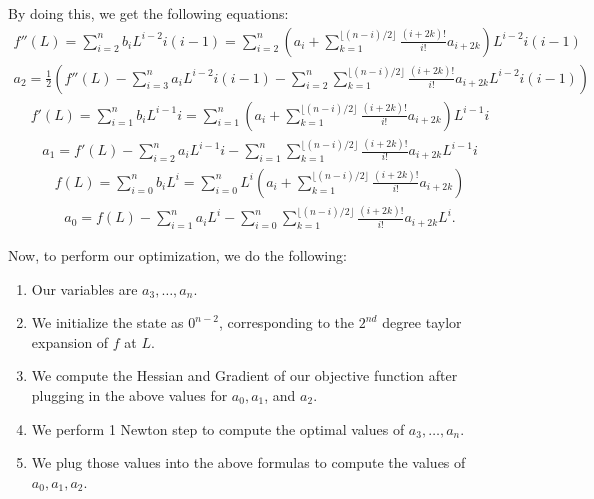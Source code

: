 \documentclass[11pt]{article}
\begin{document}
By doing this, we get the following equations:
\begin{align}
    f''(L) = \sum_{i=2}^n b_i L^{i-2} i(i-1) = \sum_{i=2}^n \left(a_i + \sum_{k=1}^{\lfloor (n-i)/2\rfloor} \frac{(i+2k)!}{i!} a_{i+2k}\right) L^{i-2} i(i-1)
\end{align}
\begin{align}
    a_2 = \frac{1}{2}\left(f''(L) - \sum_{i=3}^n a_i L^{i-2}i(i-1) - \sum_{i=2}^n \sum_{k=1}^{\lfloor (n-i)/2\rfloor} \frac{(i+2k)!}{i!} a_{i+2k}L^{i-2}i(i-1)\right)
\end{align}
\begin{align}
    f'(L) = \sum_{i=1}^n b_i L^{i-1} i = \sum_{i=1}^n \left(a_i + \sum_{k=1}^{\lfloor (n-i)/2\rfloor} \frac{(i+2k)!}{i!} a_{i+2k}\right) L^{i-1}i
\end{align}
\begin{align}
    a_1 = f'(L) - \sum_{i=2}^n a_i L^{i-1}i - \sum_{i=1}^n\sum_{k=1}^{\lfloor (n-i)/2\rfloor} \frac{(i+2k)!}{i!} a_{i+2k}L^{i-1}i
\end{align}
\begin{align}
    f(L) = \sum_{i=0}^n b_i L^i = \sum_{i=0}^n L^i \left( a_i + \sum_{k=1}^{\lfloor (n-i)/2\rfloor} \frac{(i+2k)!}{i!} a_{i+2k}\right)
\end{align}
\begin{align}
    a_0 = f(L) - \sum_{i=1}^n a_i L^i - \sum_{i=0}^n \sum_{k=1}^{\lfloor (n-i)/2\rfloor} \frac{(i+2k)!}{i!} a_{i+2k}L^i.
\end{align}

Now, to perform our optimization, we do the following:

\begin{enumerate}
    \item Our variables are $a_3, \dots, a_n$.
    \item We initialize the state as $0^{n-2}$, corresponding to the $2^{nd}$ degree taylor expansion of $f$ at $L$.
    \item We compute the Hessian and Gradient of our objective function after plugging in the above values for $a_0, a_1$, and $a_2$.
    \item We perform 1 Newton step to compute the optimal values of $a_3, \dots, a_n$.
    \item We plug those values into the above formulas to compute the values of $a_0, a_1, a_2$.
\end{enumerate}
\end{document}
